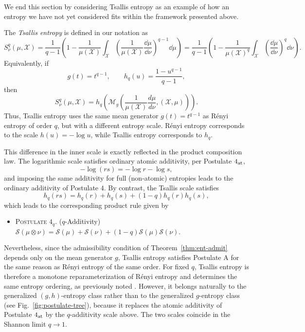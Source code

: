 \documentclass[reqno]{amsart}
\begin{document}
We end this section by considering Tsallis entropy \cite{Tsallis88} as an example of how an entropy we have not yet considered fits within the framework presented above.
\begin{example}
\label{ex:tsallis}
     The \textit{Tsallis entropy} is defined in our notation as 
    $$
S^q_\nu(\mu,\mathcal{X}) 
=   \dfrac{1}{q-1 } \left(  1-
 \frac{1}{\mu({\mathcal{X}})}\int_{{\mathcal{X}}} \left( \frac{1}{\mu({\mathcal{X}})}\dfrac{\dd \mu}{\dd \nu} \right)^{q-1}
 \dd \mu  \right) 
 =   \dfrac{1}{q-1 } \left(  1-
 \frac{1}{\mu({\mathcal{X}})^q}\int_{{\mathcal{X}}} \left( \dfrac{\dd \mu}{\dd \nu} \right)^q
 \dd \nu  \right) .
$$
Equivalently, if
$$
g(t)=t^{q-1},
\qquad
h_q(u)=\frac{1-u^{q-1}}{q-1},
$$
then
$$
S^q_\nu(\mu,\mathcal X)
=
h_q\!\left(
\mathcal{M}_g\left(\frac{1}{\mu(\mathcal X)}
\frac{d\mu}{d\nu},(\mathcal X,\mu) \right)
\right).
$$
Thus, Tsallis entropy uses the same mean generator
$g(t)=t^{q-1}$ as R\'enyi entropy of order $q$, but with a different entropy scale. 
R\'enyi entropy corresponds to the scale
$h(u)=-\log u$, while Tsallis entropy corresponds to $h_q$.

This difference in the inner scale is exactly reflected in the product
composition law. The logarithmic scale satisfies ordinary atomic additivity, per Postulate $4_{\rm at}$,
$$
-\log(rs)= -\log r-\log s,
$$
and imposing the same additivity for full (non-atomic) entropies leads to the ordinary additivity of Postulate $4$. By contrast, the Tsallis scale satisfies
$$
h_q(rs)
=
h_q(r)+h_q(s)+(1-q)h_q(r)h_q(s),
$$
which leads to the corresponding product rule given by
\begin{itemize}
    \item[] \textsc{Postulate $4_{q}$.} ($q$-Additivity) \quad $\mathcal{S}(\mu \otimes \nu) = \mathcal{S}(\mu) + \mathcal{S}(\nu) +(1-q)\mathcal{S}(\mu) \mathcal{S}(\nu)$.
\end{itemize}
Nevertheless, since the admissibility condition of
Theorem~\ref{thm:ent-admit} depends only on the mean generator $g$, Tsallis
entropy satisfies Postulate A for the same reason as R\'enyi entropy of the
same order. For fixed $q$, Tsallis entropy is therefore a monotone reparameterization of R\'enyi entropy and determines the same entropy ordering, as previously noted \cite{CzaNau02, DukkBhat07, Leo08}.
However, it belongs naturally to the generalized $(g,h)$-entropy class rather than to the generalized $g$-entropy class (see Fig.~\ref{fig:postulate-tree}), because it replaces the atomic additivity of Postulate $4_{\rm at}$ by the $q$-additivity scale above. The two scales coincide in the Shannon limit $q \to 1$.
\end{example}
\end{document}
